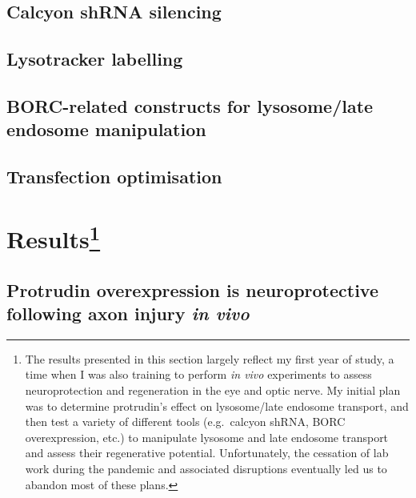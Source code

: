 \documentclass[
  12pt,
  a4paper,
]{book}
\begin{document}
\hypertarget{calcyon-shrna-silencing}{%
\subsection{Calcyon shRNA silencing}\label{calcyon-shrna-silencing}}

\hypertarget{lysotracker-labelling}{%
\subsection{Lysotracker labelling}\label{lysotracker-labelling}}

\hypertarget{borc-related-constructs-for-lysosomelate-endosome-manipulation}{%
\subsection{BORC-related constructs for lysosome/late endosome manipulation}\label{borc-related-constructs-for-lysosomelate-endosome-manipulation}}

\hypertarget{transfection-optimisation}{%
\subsection{Transfection optimisation}\label{transfection-optimisation}}

\hypertarget{results}{%
\section[Results]{\texorpdfstring{Results\footnote{The results presented in this section largely reflect my first year of study, a time when I was also training to perform \emph{in vivo} experiments to assess neuroprotection and regeneration in the eye and optic nerve. My initial plan was to determine protrudin's effect on lysosome/late endosome transport, and then test a variety of different tools (e.g.~calcyon shRNA, BORC overexpression, etc.) to manipulate lysosome and late endosome transport and assess their regenerative potential. Unfortunately, the cessation of lab work during the pandemic and associated disruptions eventually led us to abandon most of these plans.}}{Results}}\label{results}}

\hypertarget{protrudin-ONC}{%
\subsection{\texorpdfstring{Protrudin overexpression is neuroprotective following axon injury \emph{in vivo}}{Protrudin overexpression is neuroprotective following axon injury in vivo}}\label{protrudin-ONC}}
\end{document}
